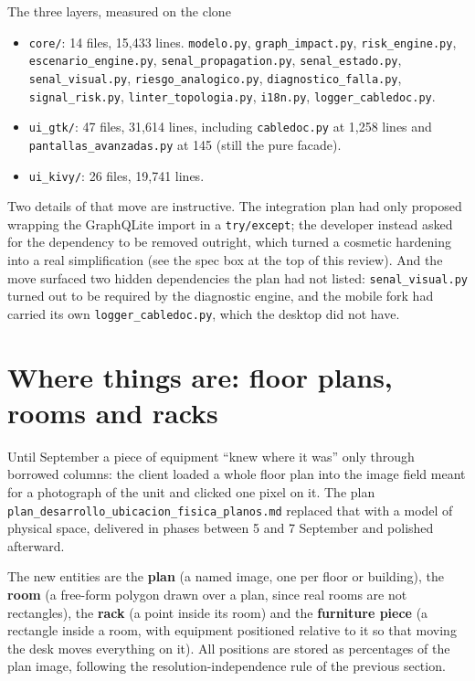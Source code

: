 \documentclass[10.4pt,twocolumn]{article}
\begin{document}
\begin{specbox}{The three layers, measured on the clone}
\begin{itemize}[leftmargin=1.0em,itemsep=2pt,topsep=2pt]
\item \texttt{core/}: 14 files, 15{,}433 lines. \texttt{modelo.py}, \texttt{graph\_impact.py}, \texttt{risk\_engine.py}, \texttt{escenario\_engine.py}, \texttt{senal\_propagation.py}, \texttt{senal\_estado.py}, \texttt{senal\_visual.py}, \texttt{riesgo\_analogico.py}, \texttt{diagnostico\_falla.py}, \texttt{signal\_risk.py}, \texttt{linter\_topologia.py}, \texttt{i18n.py}, \texttt{logger\_cabledoc.py}.
\item \texttt{ui\_gtk/}: 47 files, 31{,}614 lines, including \texttt{cabledoc.py} at 1{,}258 lines and \texttt{pantallas\_avanzadas.py} at 145 (still the pure facade).
\item \texttt{ui\_kivy/}: 26 files, 19{,}741 lines.
\end{itemize}
\end{specbox}

Two details of that move are instructive. The integration plan had only proposed wrapping the GraphQLite import in a \texttt{try/except}; the developer instead asked for the dependency to be removed outright, which turned a cosmetic hardening into a real simplification (see the spec box at the top of this review). And the move surfaced two hidden dependencies the plan had not listed: \texttt{senal\_visual.py} turned out to be required by the diagnostic engine, and the mobile fork had carried its own \texttt{logger\_cabledoc.py}, which the desktop did not have.

\section{Where things are: floor plans, rooms and racks}

Until September a piece of equipment ``knew where it was'' only through borrowed columns: the client loaded a whole floor plan into the image field meant for a photograph of the unit and clicked one pixel on it. The plan \texttt{plan\_desarrollo\_ubicacion\_fisica\_planos.md} replaced that with a model of physical space, delivered in phases between 5 and 7 September and polished afterward.

The new entities are the \textbf{plan} (a named image, one per floor or building), the \textbf{room} (a free-form polygon drawn over a plan, since real rooms are not rectangles), the \textbf{rack} (a point inside its room) and the \textbf{furniture piece} (a rectangle inside a room, with equipment positioned relative to it so that moving the desk moves everything on it). All positions are stored as percentages of the plan image, following the resolution-independence rule of the previous section.
\end{document}
